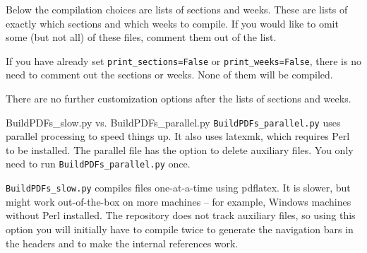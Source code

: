 \documentclass[10pt]{beamer}
\begin{document}
\begin{frame}
Below the compilation choices are lists of sections and weeks. These are lists of exactly which sections and which weeks to compile. If you would like to omit some (but not all) of these files, comment them out of the list.\vfill

If you have already set \texttt{print\_sections=False} or \texttt{print\_weeks=False}, there is no need to comment out the sections or weeks. None of them will be compiled.
\vfill

There are no further customization options after the lists of sections and weeks.
\end{frame}

\begin{frame}{{BuildPDFs\_slow.py} vs. {BuildPDFs\_parallel.py}}
\texttt{BuildPDFs\_parallel.py} uses parallel processing to speed things up. It also uses latexmk, which requires Perl to be installed. The parallel file has the option to delete auxiliary files. You only need to run \texttt{BuildPDFs\_parallel.py} once.
\vfill

\texttt{BuildPDFs\_slow.py} compiles files one-at-a-time using pdflatex. It is slower, but might work out-of-the-box on more machines -- for example, Windows machines without Perl installed. The repository does not track auxiliary files, so using this option you will initially have to compile twice to generate the navigation bars in the headers and to make the internal references work.
\end{frame}

\end{document}
